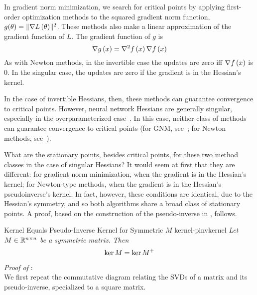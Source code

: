 \documentclass[../../thesis.tex]{subfiles}
\begin{document}
In gradient norm minimization,
we search for critical points
by applying first-order optimization methods
to the squared gradient norm function,
$g(\theta) = \lVert\nabla L\left(\theta\right)\rVert^2$.
These methods also make a linear approximation
of the gradient function of $L$.
The gradient function of $g$ is
\begin{equation}
	\nabla g\left(x\right) = \nabla^2f\left(x\right)\nabla f\left(x\right)
\end{equation}
\noindent As with Newton methods, in the invertible case
the updates are zero iff $\nabla f\left(x\right)$ is 0.
In the singular case,
the updates are zero if the gradient is in the Hessian's kernel.

In the case of invertible Hessians, then,
these methods can guarantee convergence to critical points.
However, neural network Hessians are generally singular,
especially in the overparameterized case~\cite{sagun2017,ghorbani2019}.
In this case,
neither class of methods can guarantee
convergence to critical points
(for GNM, see~\cite{doye2002};
for Newton methods, see~\cite{powell1970,griewank1983}).

What are the stationary points, besides critical points,
for these two method classes in the case of singular Hessians?
It would seem at first that they are different:
for gradient norm minimization,
when the gradient is in the Hessian's kernel;
for Newton-type methods,
when the gradient is in the Hessian's pseudoinverse's kernel.
In fact, however,
these conditions are identical, due to the Hessian's symmetry,
and so both algorithms share a broad class of stationary points.
A proof, based on the construction of the pseudo-inverse in
, follows.

\begin{theorem}{Kernel Equals Pseudo-Inverse Kernel for Symmetric $M$}%
{kernel-pinvkernel}
	\emph{%
		Let $M\in\mathbb{R}^{n \times n}$ be a symmetric matrix.
		Then
		\begin{equation}
			\ker M  = \ker M^{+}
		\end{equation}
	}
\end{theorem}

\noindent \textit{Proof of }:\\
We first repeat the commutative diagram
relating the SVDs of a matrix and its pseudo-inverse,
specialized to a square matrix.

\begin{center}
\end{center}
\end{document}

